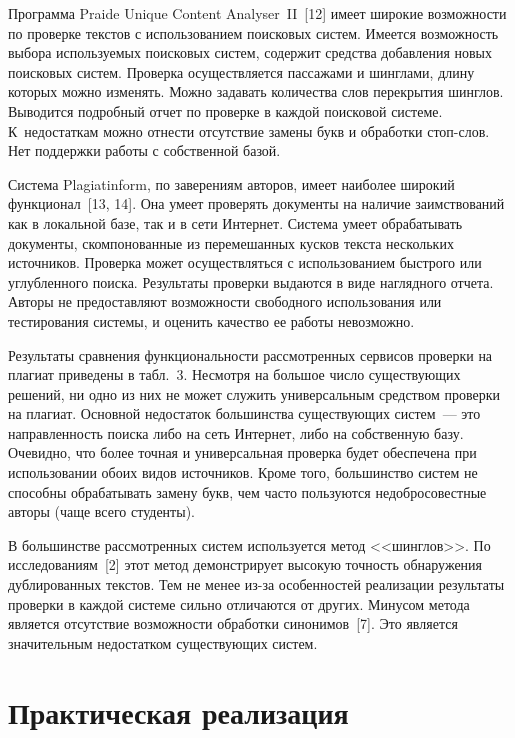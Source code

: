 \begin{multicols}{2}
  Программа Praide Unique Content Analyser~II~[12] имеет широкие 
возможности по проверке текстов с использованием поисковых сис\-тем. 
Имеется возможность выбора используемых поисковых сис\-тем, содержит 
средства добавления новых поисковых сис\-тем. Проверка осуществляется 
пассажами и шинглами, длину которых можно изменять. Можно задавать 
количества слов перекрытия шинглов. Выводится подробный отчет по проверке 
в каждой поисковой сис\-те\-ме. К~недостаткам можно отнести отсутствие 
замены букв и обработки стоп-слов. Нет поддержки работы с собственной 
базой.
  
  Система {Plagiatinform}, по заверениям авторов, имеет наиболее 
широкий функционал~[13, 14]. Она умеет проверять документы на наличие 
заимствований как в локальной базе, так и в сети Интернет. Сис\-те\-ма умеет 
обрабатывать документы, скомпонованные из перемешанных кусков текста 
нескольких источников. Проверка может осуществляться с использованием 
быстрого или углубленного поиска. Результаты проверки выдаются в виде 
наглядного отчета. Авторы не предоставляют возможности свободного 
использования или тестирования сис\-те\-мы, и оценить качество ее работы 
невозможно.
  
  Результаты сравнения функциональности рассмотренных сервисов проверки 
на плагиат приведены в табл.~3. Несмотря на большое число существующих 
решений, ни одно из них не может служить универсальным средством проверки 
на плагиат. Основной недостаток большинства существующих сис\-тем~--- это 
направленность поиска либо на сеть Интернет, либо на собственную базу. 
Очевидно, что более точная и универсальная проверка будет обеспечена при 
использовании обоих видов источников. Кроме того, большинство сис\-тем не 
способны обрабатывать замену букв, чем часто пользуются недобросовестные 
авторы (чаще всего студенты).



  В большинстве рассмотренных сис\-тем используется метод <<шинглов>>. 
По исследованиям~[2] этот метод демонстрирует высокую точность 
обнаружения дублированных текстов. Тем не менее из-за особенностей 
реализации результаты проверки в каждой сис\-те\-ме сильно отличаются от 
других. Минусом метода является отсутствие возможности обработки 
синонимов~[7]. Это является значительным недостатком существующих 
  сис\-тем. 

\section{Практическая реализация}
  

\end{multicols}
